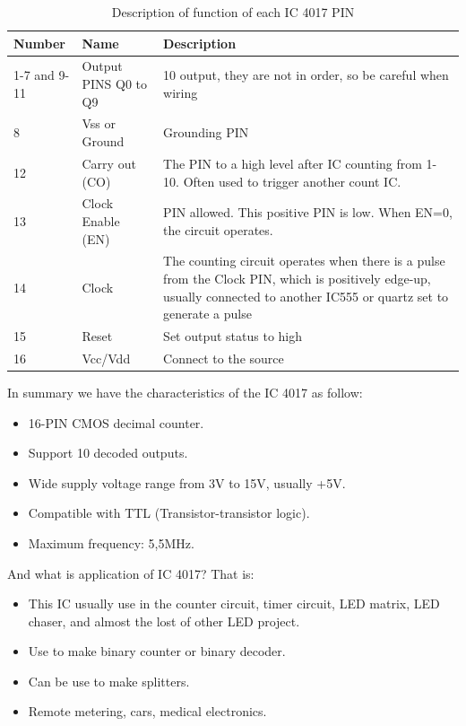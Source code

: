 \documentclass[a4paper]{report}
\begin{document}
        \begin{table}[ht]
            \centering
            \begin{tabular}{ | l | l | p{6cm} | }
                \hline
                Number & Name & Description \\ \hline
                1-7 and 9-11 & Output PINS Q0 to Q9 & 10 output, they are not in order, 
                so be careful when wiring \\ \hline
                8 & Vss or Ground & Grounding PIN \\ \hline
                12 & Carry out (CO) & The PIN to a high level after IC counting from 1-10. 
                Often used to trigger another count IC. \\ \hline
                13 & Clock Enable (EN) & PIN allowed. This positive PIN is low. When EN=0, 
                the circuit operates. \\ \hline
                14 & Clock & The counting circuit operates when there is a pulse from the 
                Clock PIN, which is positively edge-up, usually connected to another IC555 
                or quartz set to generate a pulse \\ \hline
                15 & Reset & Set output status to high \\ \hline
                16 & Vcc/Vdd & Connect to the source \\ 
                \hline 
            \end{tabular}
            \caption{\label{tab:third}Description of function of each IC 4017 PIN}
        \end{table}
        \newpage
        \par In summary we have the characteristics of the IC 4017 as follow:
        \linebreak
        \begin{itemize}
            \item 16-PIN CMOS decimal counter.
            \item Support 10 decoded outputs.
            \item Wide supply voltage range from 3V to 15V, usually +5V.
            \item Compatible with TTL (Transistor-transistor logic).
            \item Maximum frequency: 5,5MHz.
        \end{itemize}
        \par And what is application of IC 4017? That is:
        \linebreak
        \begin{itemize}
            \item This IC usually use in the counter circuit, timer circuit, LED matrix, LED chaser, 
            and almost the lost of other LED project.
            \item Use to make binary counter or binary decoder.
            \item Can be use to make splitters.
            \item Remote metering, cars, medical electronics.
        \end{itemize}
\end{document}
